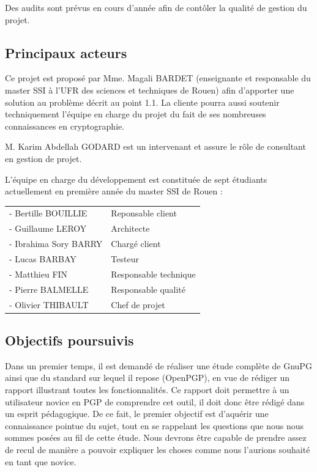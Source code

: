 \documentclass{../res/univ-projet}
\begin{document}
Des audits sont prévus en cours d'année afin de contôler la qualité de gestion du projet.

\subsection{Principaux acteurs}

Ce projet est proposé par Mme. Magali BARDET (enseignante et responsable du master SSI à l'UFR des sciences et techniques de Rouen) 
afin d'apporter une solution au problème décrit au point 1.1. La cliente pourra aussi soutenir techniquement l'équipe en charge du projet du 
fait de ses nombreuses connaissances en cryptographie.

M. Karim Abdellah GODARD est un intervenant et assure le rôle de consultant en gestion de projet.

L'équipe en charge du développement est constituée de sept étudiants actuellement en première année du master SSI de Rouen : 
\\

\begin{tabular}{ll}
- Bertille BOUILLIE & Reponsable client \\
- Guillaume LEROY & Architecte \\
- Ibrahima Sory BARRY & Chargé client \\
- Lucas BARBAY & Testeur \\
- Matthieu FIN & Responsable technique \\
- Pierre BALMELLE & Responsable qualité \\
- Olivier THIBAULT & Chef de projet \\
\end{tabular}

\newpage

\subsection{Objectifs poursuivis}

Dans un premier temps, il est demandé de réaliser une étude complète de GnuPG ainsi que du standard sur lequel il repose (OpenPGP), en vue de 
rédiger un rapport illustrant toutes les fonctionnalités. Ce rapport doit permettre à un utilisateur novice en PGP de comprendre cet outil, 
il doit donc être rédigé dans un esprit pédagogique. De ce fait, le premier objectif est d'aquérir une connaissance pointue du sujet, tout en 
se rappelant les questions que nous nous sommes posées au fil de cette étude. Nous devrons être capable de prendre assez de recul de manière a 
pouvoir expliquer les choses comme nous l'aurions souhaité en tant que novice.
\end{document}
